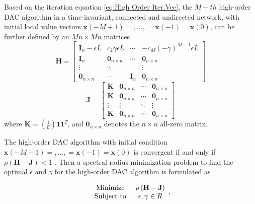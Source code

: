 Based on the iteration equation \ref{eq:High Order Iter.Vec}, the
$M-th$ high-order DAC algorithm in a time-invariant, connected and
undirected network, with initial local value vectors $\mathbf{x}(-M+1)=,\ldots,=\mathbf{x}(-1)=\mathbf{x}(0)$,
can be further defined by an $Mn\times Mn$ matrices
\begin{equation}
\mathbf{H}=\left[\begin{array}{cccc}
\mathbf{I}_{n}-\epsilon L & c_{2}\gamma\epsilon L & \cdots & -c_{M}(-\gamma)^{M-1}\epsilon L\\
\mathbf{I}_{n} & \mathbf{0}_{n\times n} & \cdots & \mathbf{0}_{n\times n}\\
\vdots & \ddots &  & \vdots\\
\mathbf{0}_{n\times n} & \cdots & \mathbf{I}_{n} & \mathbf{0}_{n\times n}
\end{array}\right]
\end{equation}
\begin{equation}
\mathbf{J}=\left[\begin{array}{cccc}
\mathbf{K} & \mathbf{0}_{n\times n} & \cdots & \mathbf{0}_{n\times n}\\
\mathbf{K} & \mathbf{0}_{n\times n} & \cdots & \mathbf{0}_{n\times n}\\
\vdots & \vdots & \ddots & \vdots\\
\mathbf{K} & \mathbf{0}_{n\times n} & \cdots & \mathbf{0}_{n\times n}
\end{array}\right]
\end{equation}
 where $\mathbf{K}=\left(\frac{1}{n}\right)\mathbf{1}\mathbf{1}^{T}$,
and $\mathbf{0}_{n\times n}$ denotes the $n\times n$ all-zero matrix. 

The high-order DAC algorithm with initial condition $\mathbf{x}(-M+1)=,\ldots,=\mathbf{x}(-1)=\mathbf{x}(0)$
is convergent if and only if $\rho\left(\mathbf{H}-\mathbf{J}\right)<1$
\cite{Xiong2010}. Then a spectral radius minimization problem to
find the optimal $\epsilon$ and $\gamma$ for the high-order DAC
algorithm is formulated as

\begin{equation}
\begin{array}{cc}
\mbox{\mbox{Minimize }} & \rho\left(\mathbf{H}-\mathbf{J}\right)\\
\mbox{Subject to } & \epsilon,\gamma\in R
\end{array},\label{eq: High order spectral radius problem}
\end{equation}


